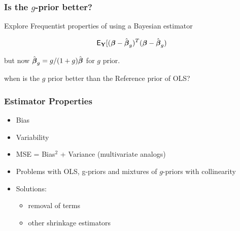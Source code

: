 \documentclass[]{beamer}
\begin{document}
\begin{frame}
  \frametitle{Is the $g$-prior better?}
  
Explore Frequentist properties of using a Bayesian estimator

$$\textsf{E}_{\mathbf{Y}}[( \boldsymbol{\beta} - \hat{\boldsymbol{\beta}}_g)^T(\boldsymbol{\beta} -\hat{\boldsymbol{\beta}}_g)$$

but now $\hat{\boldsymbol{\beta}}_g = g/(1+g) \hat{\boldsymbol{\beta}}$ for $g$ prior. \pause

\vfill when is the $g$ prior better than the Reference prior of OLS?
\end{frame}

\begin{frame}\frametitle{Estimator Properties}

  \begin{itemize}
  \item  Bias  \pause
  \item  Variability \pause
  \item MSE = Bias$^2$ + Variance  (multivariate analogs) \pause
\item Problems with OLS, g-priors and mixtures of $g$-priors with collinearity \pause
\item Solutions: \pause
  \begin{itemize}
  \item removal of terms \pause
   \item other shrinkage estimators
  \end{itemize}

  \end{itemize}
\end{frame}
\end{document}
